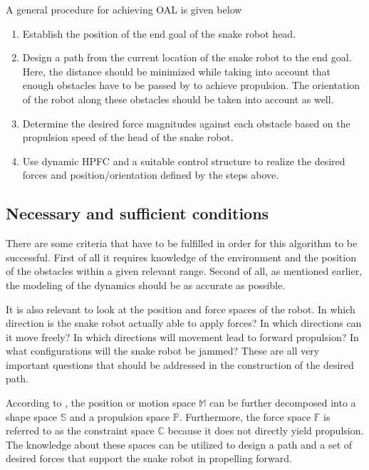 A general procedure for achieving OAL is given below

\begin{enumerate}
    \item Establish the position of the end goal of the snake robot head.
    \item Design a path from the current location of the snake robot to the end goal. Here, the distance should be minimized while taking into account that enough obstacles have to be passed by to achieve propulsion. The orientation of the robot along these obstacles should be taken into account as well.
    \item Determine the desired force magnitudes against each obstacle based on the propulsion speed of the head of the snake robot.
    \item Use dynamic HPFC and a suitable control structure to realize the desired forces and position/orientation defined by the steps above.
\end{enumerate}

\subsection{Necessary and sufficient conditions}

There are some criteria that have to be fulfilled in order for this algorithm to be successful. First of all it requires knowledge of the environment and the position of the obstacles within a given relevant range. Second of all, as mentioned earlier, the modeling of the dynamics should be as accurate as possible.

It is also relevant to look at the position and force spaces of the robot. In which direction is the snake robot actually able to apply forces? In which directions can it move freely? In which directions will movement lead to forward propulsion? In what configurations will the snake robot be jammed? These are all very important questions that should be addressed in the construction of the desired path.

According to \cite{StavdahlNote}, the position or motion space $\mathbb{M}$ can be further decomposed into a shape space $\mathbb{S}$ and a propulsion space $\mathbb{P}$. Furthermore, the force space $\mathbb{F}$ is referred to as the constraint space $\mathbb{C}$ because it does not directly yield propulsion. The knowledge about these spaces can be utilized to design a path and a set of desired forces that support the snake robot in propelling forward.


